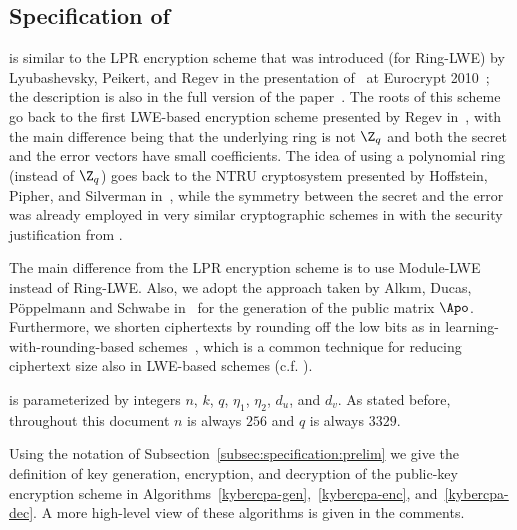 \subsection{Specification of \KyberCPAPKE}
\label{subsec:specification:cpaenc}

\KyberCPAPKE is similar to the LPR encryption scheme that was introduced
(for Ring-LWE) by Lyubashevsky, Peikert, and Regev in the presentation
of~\cite{LPR10} at Eurocrypt 2010~\cite{Eurocrypt2010PeikertSlides};
the description is also in the full version of the paper~\cite[Sec.~1.1]{lyubashevsky2013RLWE}.
The roots of this scheme go back to the first LWE-based encryption scheme
presented by Regev in~\cite{regev2005lattices,regev2009lwe}, with the main difference being that the underlying ring is not $\Z_q$ and both the secret and the error vectors have small coefficients.  The idea of using a polynomial ring (instead of $\Z_q$) goes back to the NTRU cryptosystem
presented by Hoffstein, Pipher, and Silverman in~\cite{hoffstein1998ntru}, while the symmetry between the secret and the error was already employed in very similar cryptographic schemes in \cite{DBLP:conf/focs/Alekhnovich03,DBLP:conf/tcc/LyubashevskyPS10} with the security justification from \cite{DBLP:conf/crypto/ApplebaumCPS09}. 

The main difference from the LPR encryption scheme 
is to use Module-LWE instead of Ring-LWE. 
Also, we adopt the approach taken by Alk{\i}m, Ducas, Pöppelmann and Schwabe in~\cite{ADPS16}
for the generation of the public matrix $\Apo$.
Furthermore, we shorten ciphertexts by rounding off
the low bits as in learning-with-rounding-based schemes~\cite[Eq.~2.1]{banerjee2012pseudorandom}, 
which is a common technique for reducing ciphertext size also in LWE-based schemes (c.f. \cite{Pei09b,Poppelmann2013hwrlwe}).

\KyberCPAPKE is parameterized by integers $n$, $k$, $q$, $\eta_1$, $\eta_2$, $d_u$, and $d_v$.
As stated before, throughout this document $n$ is always $256$ and $q$ is always $3329$.

Using the notation of Subsection~\ref{subsec:specification:prelim} we give the definition of key generation, encryption, and decryption
of the \KyberCPAPKE public-key encryption scheme in Algorithms~\ref{kybercpa-gen},~\ref{kybercpa-enc}, and~\ref{kybercpa-dec}.
A more high-level view of these algorithms is given in the comments.

